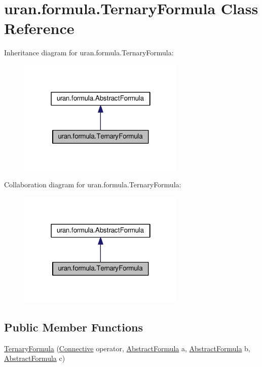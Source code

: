 \hypertarget{classuran_1_1formula_1_1_ternary_formula}{}\section{uran.\+formula.\+Ternary\+Formula Class Reference}
\label{classuran_1_1formula_1_1_ternary_formula}


Inheritance diagram for uran.\+formula.\+Ternary\+Formula\+:
\nopagebreak
\begin{figure}[H]
\begin{center}
\leavevmode
\includegraphics[width=226pt]{classuran_1_1formula_1_1_ternary_formula__inherit__graph}
\end{center}
\end{figure}


Collaboration diagram for uran.\+formula.\+Ternary\+Formula\+:
\nopagebreak
\begin{figure}[H]
\begin{center}
\leavevmode
\includegraphics[width=226pt]{classuran_1_1formula_1_1_ternary_formula__coll__graph}
\end{center}
\end{figure}
\subsection*{Public Member Functions}
\begin{DoxyCompactItemize}
\item 
\hyperlink{classuran_1_1formula_1_1_ternary_formula_aedcaf82a5780d276ac06528d8227d163}{Ternary\+Formula} (\hyperlink{enumuran_1_1formula_1_1_connective}{Connective} operator, \hyperlink{classuran_1_1formula_1_1_abstract_formula}{Abstract\+Formula} a, \hyperlink{classuran_1_1formula_1_1_abstract_formula}{Abstract\+Formula} b, \hyperlink{classuran_1_1formula_1_1_abstract_formula}{Abstract\+Formula} c)
\end{DoxyCompactItemize}


